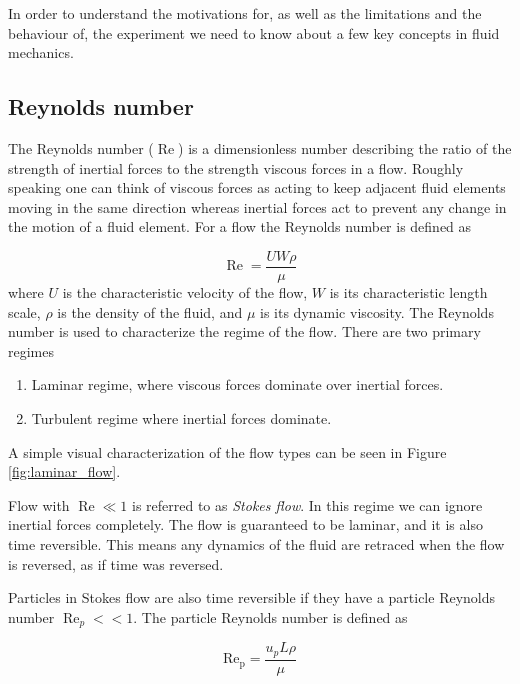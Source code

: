 \label{sec:fluid}
In order to understand the motivations for, as well as the limitations and the behaviour of, the experiment we need to know about a few key concepts in fluid mechanics.

\subsection{Reynolds number}
The Reynolds number ($\operatorname{Re}$) is a dimensionless number describing the ratio of the strength of inertial forces to the strength viscous forces in a flow. Roughly speaking one can think of viscous forces as acting to keep adjacent fluid elements moving in the same direction whereas inertial forces act to prevent any change in the motion of a fluid element. For a flow the Reynolds number is defined as \cite{introfluid}

\begin{equation}\label{eq:reynolds}
\operatorname{Re} = \frac{U W \rho}{\mu}
\end{equation}
where $U$ is the characteristic velocity of the flow, $W$ is its characteristic length scale, $\rho$ is the density of the fluid, and $\mu$ is its dynamic viscosity. The Reynolds number is used to characterize the regime of the flow. There are two primary regimes
\begin{enumerate}
\item Laminar regime, where viscous forces dominate over inertial forces.
\item Turbulent regime where inertial forces dominate.
\end{enumerate}

\noindent A simple visual characterization of the flow types can be seen in Figure \ref{fig:laminar_flow}. 

Flow with $\operatorname{Re}\ll 1$ is referred to as \emph{Stokes flow}. In this regime we can ignore inertial forces completely. The flow is guaranteed to be laminar, and it is also time reversible. This means any dynamics of the fluid are retraced when the flow is reversed, as if time was reversed. ~\cite{introfluid3}
 
Particles in Stokes flow are also time reversible if they have a particle Reynolds number $\operatorname{Re}_p << 1$. The particle Reynolds number is defined as \cite{JonasLic}

\begin{equation}\label{eq:reynoldsparticle}
\operatorname{Re_p} = \frac{u_p L \rho}{\mu}
\end{equation}

